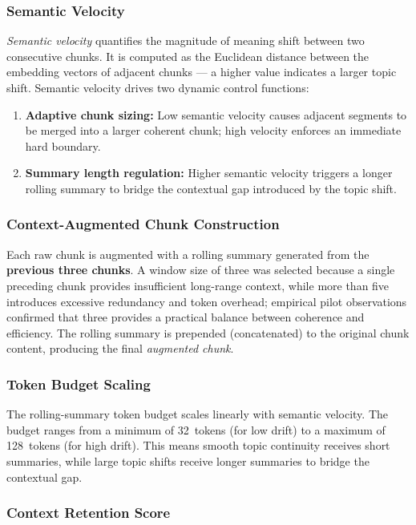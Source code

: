 \documentclass[12pt,a4paper]{article}
\begin{document}
\subsubsection{Semantic Velocity}

\emph{Semantic velocity} quantifies the magnitude of meaning shift between
two consecutive chunks. It is computed as the Euclidean distance between the
embedding vectors of adjacent chunks --- a higher value indicates a larger
topic shift. Semantic velocity drives two dynamic control functions:

\begin{enumerate}
  \item \textbf{Adaptive chunk sizing:} Low semantic velocity causes adjacent
    segments to be merged into a larger coherent chunk; high velocity enforces
    an immediate hard boundary.
  \item \textbf{Summary length regulation:} Higher semantic velocity triggers
    a longer rolling summary to bridge the contextual gap introduced by the
    topic shift.
\end{enumerate}

\subsubsection{Context-Augmented Chunk Construction}

Each raw chunk is augmented with a rolling summary generated from the
\textbf{previous three chunks}. A window size of three was selected because
a single preceding chunk provides insufficient long-range context, while
more than five introduces excessive redundancy and token overhead; empirical
pilot observations confirmed that three provides a practical balance between
coherence and efficiency. The rolling summary is prepended (concatenated) to
the original chunk content, producing the final \emph{augmented chunk}.

\subsubsection{Token Budget Scaling}

The rolling-summary token budget scales linearly with semantic velocity.
The budget ranges from a minimum of 32~tokens (for low drift) to a maximum
of 128~tokens (for high drift). This means smooth topic continuity receives
short summaries, while large topic shifts receive longer summaries to bridge
the contextual gap.

\subsubsection{Context Retention Score}
\end{document}
